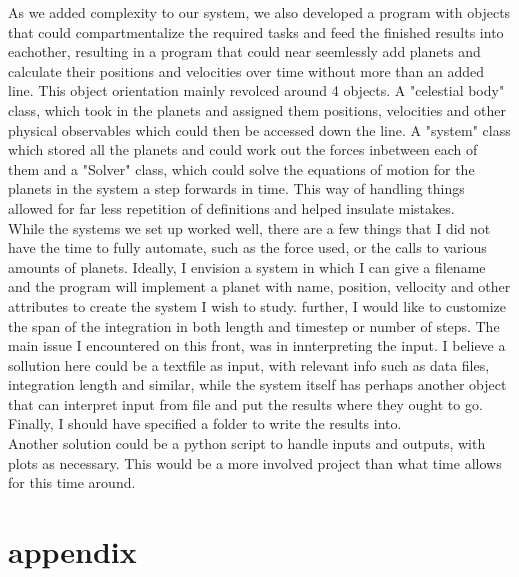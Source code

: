 \documentclass[10pt, twocolumn]{revtex4-1}
\begin{document}
As we added complexity to our system, we also developed a program with objects that could 
compartmentalize the required tasks and feed the finished results into eachother, resulting in a program that could near seemlessly add planets and 
calculate their positions and velocities over time without more than an added line. This object orientation mainly revolced around 4 objects. A "celestial 
body" class, which took in the planets and assigned them positions, velocities and other physical observables which could then be accessed down the line. 
A "system" class which stored all the planets and could work out the forces inbetween each of them and a "Solver" class, which could solve the equations of 
motion for the planets in the system a step forwards in time. This way of handling things allowed for far less repetition of definitions and helped insulate
mistakes.\\

While the systems we set up worked well, there are a few things that I did not have the time to fully automate, such as the force used, or the calls to various 
amounts of planets. Ideally, I envision a system in which I can give a filename and the program will implement a planet with name, position, vellocity and 
other attributes to create the system I wish to study. further, I would like to customize the span of the integration in both length and timestep or number of
steps. The main issue I encountered on this front, was in innterpreting the input. I believe a sollution here could be a textfile as input, with relevant info
such as data files, integration length and similar, while the system itself has perhaps another object that can interpret input from file and put the results
where they ought to go. Finally, I should have specified a folder to write the results into. \\
Another solution could be a python script to handle inputs and outputs, with plots as necessary. This would be a more involved project than what time allows 
for this time around. 

\section{appendix}


\end{document}
